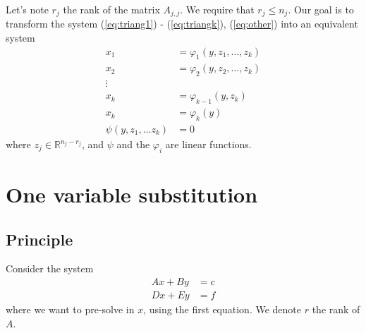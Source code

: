 \documentclass[]{article}
\theoremstyle{definition}
\begin{document}
Let's note $r_j$ the rank of the matrix $A_{j,j}$. We require that $r_j \leq n_j$.
Our goal is to transform the system (\ref{eq:triang1}) - (\ref{eq:triangk}), (\ref{eq:other}) into an equivalent system
\begin{align}
  x_1 &= \varphi_1(y,z_1, \ldots, z_k) \\
	x_2 &= \varphi_2(y,z_2, \ldots, z_k) \\
  \vdots & \nonumber \\
	x_k &= \varphi_{k-1}(y,z_k) \\
	x_k &= \varphi_k(y) \\
	\psi(y,z_1, \ldots z_k) &= 0
\end{align}
where $z_j \in \mathbb{R}^{n_j-r_j}$, and $\psi$ and the $\varphi_i$ are linear functions.


\section{One variable substitution}
\subsection{Principle}
Consider the system
\begin{align}
	A x + B y &= c \label{eq:simple1}\\
	D x + E y &= f \label{eq:simple2}
\end{align}
where we want to pre-solve in $x$, using the first equation. We denote $r$ the rank of $A$.
\end{document}

